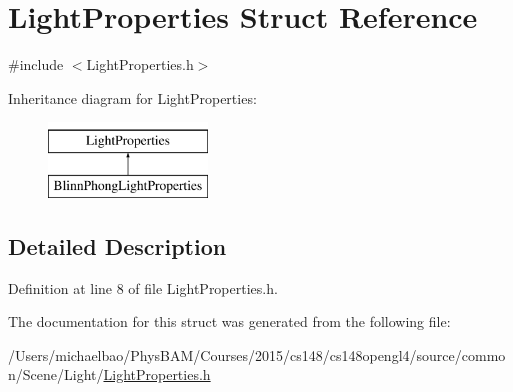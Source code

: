 \hypertarget{struct_light_properties}{}\section{Light\+Properties Struct Reference}
\label{struct_light_properties}


{\ttfamily \#include $<$Light\+Properties.\+h$>$}

Inheritance diagram for Light\+Properties\+:\begin{figure}[H]
\begin{center}
\leavevmode
\includegraphics[height=2.000000cm]{struct_light_properties}
\end{center}
\end{figure}


\subsection{Detailed Description}


Definition at line 8 of file Light\+Properties.\+h.



The documentation for this struct was generated from the following file\+:\begin{DoxyCompactItemize}
\item 
/\+Users/michaelbao/\+Phys\+B\+A\+M/\+Courses/2015/cs148/cs148opengl4/source/common/\+Scene/\+Light/\hyperlink{_light_properties_8h}{Light\+Properties.\+h}\end{DoxyCompactItemize}
